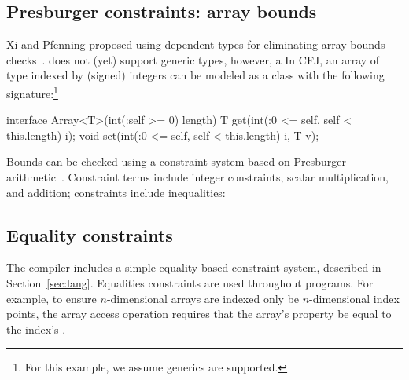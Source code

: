 \subsection{Presburger constraints: array bounds}

Xi and Pfenning proposed using dependent types for eliminating
array bounds checks~\cite{xi98array}.
\Xten{} does not (yet) support generic types, however, a 
In CFJ, an array of type  indexed by (signed) integers
can be modeled as a class with the following
signature:\footnote{For this example, we assume generics
are supported.}
\begin{displayxten}
interface Array<T>(int(:self >= 0) length) {
  T get(int(:0 <= self, self < this.length) i);
  void set(int(:0 <= self, self < this.length) i, T v);
}
\end{displayxten}

Bounds can be checked using a constraint system based on
Presburger arithmetic~\cite{omega}.  Constraint terms include
integer constraints, scalar multiplication, and addition;
constraints include inequalities:
\fi





\subsection{Equality constraints}

The \Xten{} compiler includes a simple equality-based constraint
system, described in Section~\ref{sec:lang}.
Equalities constraints
are used throughout \Xten{} programs.  For example, to ensure
$n$-dimensional arrays are indexed only be $n$-dimensional
index points, the array access operation requires that the
array's  property be equal to the index's .


